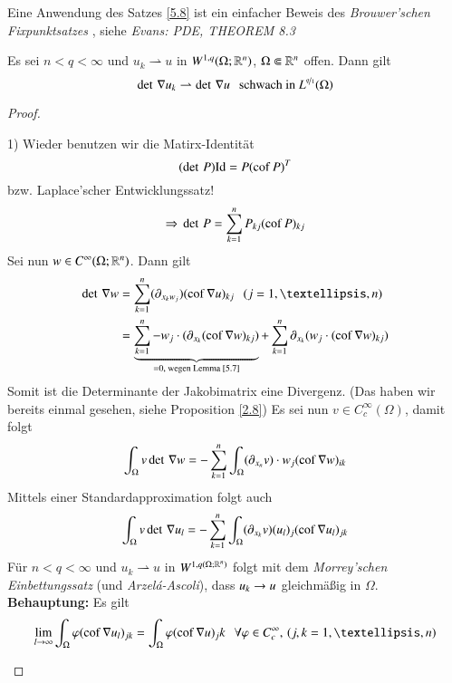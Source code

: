\begin{remark}
    Eine Anwendung des Satzes \ref{5.8} ist ein einfacher Beweis des \textit{Brouwer'schen Fixpunktsatzes
    }, siehe \textit{Evans: PDE, THEOREM 8.3}
\end{remark}

\begin{theorem}\label{5.9}
    Es sei $n<q<\infty$ und  $u_k\rightharpoonup u$ in $W^{1,q}(\Omega;\mathbb{R}^n)$, $\Omega\Subset \mathbb{R}^n$
    offen. Dann gilt
    \[
        \det \, \nabla u_k \rightharpoonup \det\, \nabla u \hspace{.25cm} \text{schwach in }L^{\nicefrac q1}(\Omega)
    \]
\end{theorem}

\begin{proof}
    \begin{description}
        \item{1)}
        Wieder benutzen wir die Matirx-Identität
        \[
            (\det\, P)\mathrm{Id} = P(\mathrm{cof} \, P)^T
        \]
        bzw. Laplace'scher Entwicklungssatz!
        \[
            \Rightarrow \, \det \, P=\sum_{k=1}^nP_{kj}(\mathrm{cof}\, P)_{kj}
        \]
        Sei nun $w\in C^\infty (\Omega;\mathbb{R}^n)$. Dann gilt
        \begin{align*}
            \det\, \nabla w &= \sum_{k=1}^n(\partial_{x_k w_j})(\mr{cof}\,\nabla u)_{kj} \qq (j=1,…,n)\\
                &=\underbrace{\sum_{k=1}^n -w_j\cdot (\partial_{x_k}(\mr{cof}\, \nabla w)_{kj})}_{=0, 
                \text{ wegen Lemma \ref{5.7}}} + 
                \sum_{k=1}^n\partial_{x_k}(w_j\cdot(\mr{cof}\, \nabla w)_{kj})
        \end{align*}
        Somit ist die Determinante der Jakobimatrix eine Divergenz.
        (Das haben wir bereits einmal gesehen, siehe Proposition \ref{2.8}) Es sei nun $v\in C_c^\infty
        (\Omega)$, damit folgt
        \[
            \int_\Omega v \det \, \nabla w = -\sum_{k=1}^n\int_{\Omega} (\partial_{x_n}v)\cdot
            w_j(\mathrm{cof}\, \nabla w)_{ik}
        \]
        Mittels einer Standardapproximation folgt auch
        \[
            \int_\Omega v \det\, \nabla u_l = - \sum_{k=1}^n \int_\Omega(\partial_{x_k}v)(u_l)_j
            (\mathrm{cof}\, \nabla u_l)_{jk}
        \]
        Für $n<q<\infty$ und $u_k\rightharpoonup u$ in $W^{1,q(\Omega; \mathbb{R}^n)}$ folgt mit dem
        \textit{Morrey'schen Einbettungssatz} (und \textit{Arzelá-Ascoli}), dass $u_k\rightarrow u$ gleichmäßig
        in $\Omega$.\\
        \noindent \textbf{Behauptung:} Es gilt
        \[
            \lim_{l\ra \infty}\int_\Omega \vp (\mr{cof}\, \nabla u_l)_{jk} = \int_\Omega \vp(\mr{cof}\,
            \nabla u)_jk\qq \forall \vp \in C_c^\infty, \, (j,k=1,…,n)
        \]


    \end{description}
\end{proof}
